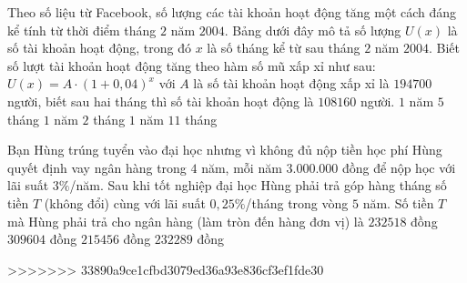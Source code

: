 \begin{ex}%
	Theo số liệu từ Facebook, số lượng các tài khoản hoạt động tăng một cách đáng kể tính từ thời điểm tháng $2$ năm $2004$. Bảng dưới đây mô tả số lượng $U(x)$ là số tài khoản hoạt động, trong đó $x$ là số tháng kể từ sau tháng $2$ năm $2004$. Biết số lượt tài khoản hoạt động tăng theo hàm số mũ xấp xỉ như sau: $U(x)=A\cdot(1+0{,}04)^x$ với $A$ là số tài khoản hoạt động xấp xỉ là $194700$ người, biết sau hai tháng thì số tài khoản hoạt động là $108160$ người. 
	\choice
	{\True $1$ năm $5$ tháng}
	{$1$ năm $2$ tháng}
	{$1$ năm}
	{$11$ tháng}
\end{ex}
\begin{ex}%
	Bạn Hùng trúng tuyển vào đại học nhưng vì không đủ nộp tiền học phí Hùng quyết định vay ngân hàng trong $4$ năm, mỗi năm $3.000.000$ đồng để nộp học với lãi suất $3\%$/năm. Sau khi tốt nghiệp đại học Hùng phải trả góp hàng tháng số tiền $T$ (không đổi) cùng với lãi suất $0{,}25\%$/tháng trong vòng $5$ năm. Số tiền $T$ mà Hùng phải trả cho ngân hàng (làm tròn đến hàng đơn vị) là
	\choice
	{$232518$ đồng}
	{$309604$ đồng}
	{$215456$ đồng}
	{\True $232289$ đồng}
\end{ex}




>>>>>>> 33890a9ce1cfbd3079ed36a93e836cf3ef1fde30
